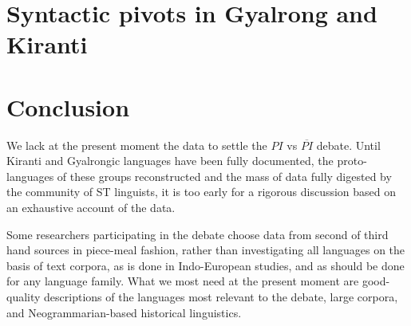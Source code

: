\documentclass[oldfontcommands,oneside,a4paper,11pt]{article}
\begin{document}
\section{Syntactic pivots in Gyalrong and Kiranti}

\section{Conclusion}

We lack at the present moment the data to settle the $PI$ vs $\overline{PI}$ debate. Until Kiranti and Gyalrongic languages have been fully documented, the proto-languages of these groups reconstructed and the mass of data fully digested by the community of ST linguists, it is too early for a rigorous discussion based on an exhaustive account of the data. 

Some researchers participating in the debate choose data from second of third hand sources in piece-meal fashion, rather than investigating all languages on the basis of text corpora, as is done in Indo-European studies, and as should be done for any language family. What we most need at the present moment are good-quality descriptions of the languages most relevant to the debate, large corpora, and Neogrammarian-based historical linguistics.



\end{document}
